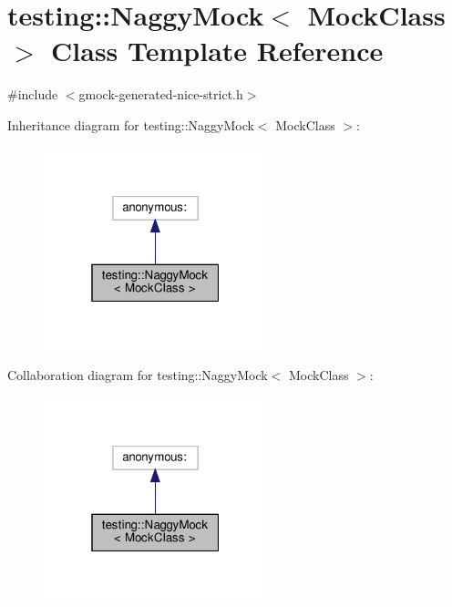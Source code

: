 \hypertarget{classtesting_1_1_naggy_mock}{}\section{testing\+:\+:Naggy\+Mock$<$ Mock\+Class $>$ Class Template Reference}
\label{classtesting_1_1_naggy_mock}


{\ttfamily \#include $<$gmock-\/generated-\/nice-\/strict.\+h$>$}



Inheritance diagram for testing\+:\+:Naggy\+Mock$<$ Mock\+Class $>$\+:
\nopagebreak
\begin{figure}[H]
\begin{center}
\leavevmode
\includegraphics[width=184pt]{classtesting_1_1_naggy_mock__inherit__graph}
\end{center}
\end{figure}


Collaboration diagram for testing\+:\+:Naggy\+Mock$<$ Mock\+Class $>$\+:
\nopagebreak
\begin{figure}[H]
\begin{center}
\leavevmode
\includegraphics[width=184pt]{classtesting_1_1_naggy_mock__coll__graph}
\end{center}
\end{figure}
